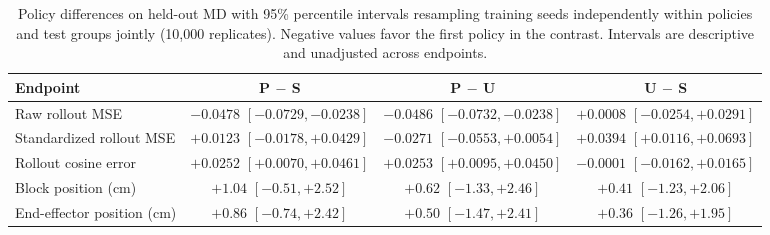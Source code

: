 \begin{table}[t]
\centering
\caption{Policy differences on held-out MD with 95\% percentile intervals resampling training seeds independently within policies and test groups jointly (10,000 replicates). Negative values favor the first policy in the contrast. Intervals are descriptive and unadjusted across endpoints.}
\label{tab:contrasts}
\footnotesize
\setlength{\tabcolsep}{5pt}
\renewcommand{\arraystretch}{1.12}
\begin{tabular}{lccc}
\toprule
Endpoint & P $-$ S & P $-$ U & U $-$ S \\
\midrule
Raw rollout MSE & $-0.0478$ $[-0.0729,-0.0238]$ & $-0.0486$ $[-0.0732,-0.0238]$ & $+0.0008$ $[-0.0254,+0.0291]$ \\
Standardized rollout MSE & $+0.0123$ $[-0.0178,+0.0429]$ & $-0.0271$ $[-0.0553,+0.0054]$ & $+0.0394$ $[+0.0116,+0.0693]$ \\
Rollout cosine error & $+0.0252$ $[+0.0070,+0.0461]$ & $+0.0253$ $[+0.0095,+0.0450]$ & $-0.0001$ $[-0.0162,+0.0165]$ \\
Block position (cm) & $+1.04$ $[-0.51,+2.52]$ & $+0.62$ $[-1.33,+2.46]$ & $+0.41$ $[-1.23,+2.06]$ \\
End-effector position (cm) & $+0.86$ $[-0.74,+2.42]$ & $+0.50$ $[-1.47,+2.41]$ & $+0.36$ $[-1.26,+1.95]$ \\
\bottomrule
\end{tabular}
\end{table}
